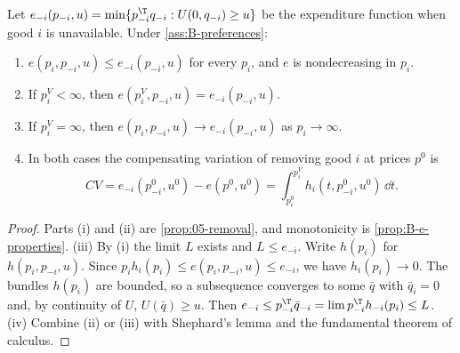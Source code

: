 \begin{proposition}\label{prop:B-virtual}
Let $e_{-i}(p_{-i}, u) = \min\{p_{-i}^\T q_{-i} : U(0, q_{-i}) \geq u\}$ be the expenditure function when good
$i$ is unavailable. Under \cref{ass:B-preferences}:
\begin{enumerate}[label=(\roman*)]
\item $e(p_i, p_{-i}, u) \leq e_{-i}(p_{-i}, u)$ for every $p_i$, and $e$ is nondecreasing in $p_i$.
\item If $p_i^V < \infty$, then $e(p_i^V, p_{-i}, u) = e_{-i}(p_{-i}, u)$.
\item If $p_i^V = \infty$, then $e(p_i, p_{-i}, u) \to e_{-i}(p_{-i}, u)$ as $p_i \to \infty$.
\item In both cases the compensating variation of removing good $i$ at prices $p^0$ is
\begin{equation}\label{eq:B-cv-removal}
CV = e_{-i}(p_{-i}^0, u^0) - e(p^0, u^0) = \int_{p_i^0}^{p_i^V}h_i(t, p_{-i}^0, u^0)\,\dd t .
\end{equation}
\end{enumerate}
\end{proposition}

\begin{proof}
Parts (i) and (ii) are \cref{prop:05-removal}, and monotonicity is \cref{prop:B-e-properties}. (iii) By (i)
the limit $L$ exists and $L \leq e_{-i}$. Write $h(p_i)$ for $h(p_i, p_{-i}, u)$. Since
$p_ih_i(p_i) \leq e(p_i, p_{-i}, u) \leq e_{-i}$, we have $h_i(p_i) \to 0$. The bundles $h(p_i)$ are bounded, so a
subsequence converges to some $\bar q$ with $\bar q_i = 0$ and, by continuity of $U$, $U(\bar q) \geq u$. Then
$e_{-i} \leq p_{-i}^\T\bar q_{-i} = \lim p_{-i}^\T h_{-i}(p_i) \leq L$. (iv) Combine (ii) or (iii) with Shephard's lemma
and the fundamental theorem of calculus.
\end{proof}

